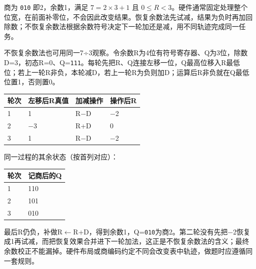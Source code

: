 商为 \texttt{010} 即2，余数1，满足 \(7=2\times3+1\) 且 \(0\le R<3\)。硬件通常固定处理整个位宽，在前面补零位，不会因此改变结果。恢复余数法先试减，结果为负时再加回除数；不恢复余数法根据余数符号决定下一轮加还是减，用不同轨迹完成同一任务。

不恢复余数法也可用同一7÷3观察。令余数R为4位有符号寄存器、Q为3位，除数D=3，初态R=0、Q=\texttt{111}。每轮先把R、Q连接左移一位，Q最高位移入R最低位；若上一轮R非负，本轮减D，若上一轮R为负则加D；运算后R非负就在Q最低位置1，否则置0。

\begin{wideblock}\par\medskip\noindent\begin{minipage}{\linewidth}\fontsize{9.3}{12}\selectfont\begin{tabularx}{\linewidth}{@{}YYYY@{}}
\toprule\noalign{}
轮次 & 左移后R真值 & 加减操作 & 操作后R \\
\midrule\noalign{}


1 & 1 & R\ensuremath{-}D & \ensuremath{-}2 \\
2 & \ensuremath{-}3 & R+D & 0 \\
3 & 1 & R\ensuremath{-}D & \ensuremath{-}2 \\
\bottomrule\end{tabularx}
\end{minipage}\par\medskip\end{wideblock}

同一过程的其余状态（按首列对应）：

\par\medskip\noindent\begin{minipage}{\linewidth}\fontsize{9.3}{12}\selectfont\begin{tabularx}{\linewidth}{@{}YY@{}}
\toprule\noalign{}
轮次 & 记商后的Q \\
\midrule\noalign{}


1 & 110 \\
2 & 101 \\
3 & 010 \\
\bottomrule\end{tabularx}
\end{minipage}\par\medskip

最后R仍负，补做R\ensuremath{\leftarrow}R+D，得到余数1，Q=\texttt{010}为商2。第二轮没有先把\ensuremath{-}2恢复成1再试减，而把恢复效果合并进下一轮加法，这正是不恢复余数法的含义；最终余数校正不能漏掉。硬件布局或商编码约定不同会改变表中轨迹，做题时应遵循同一套规则。

